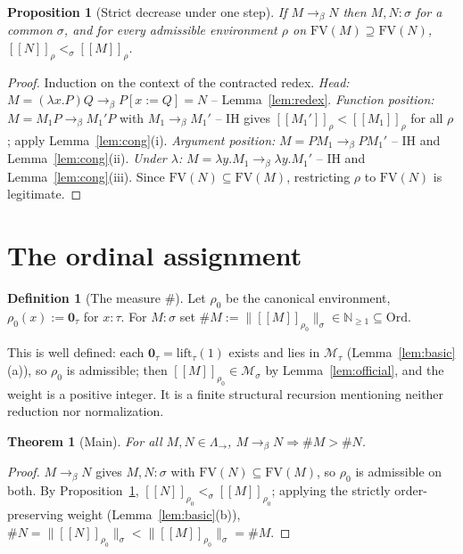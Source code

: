 \documentclass{amsart}
\newtheorem{theorem}{Theorem}
\newtheorem{proposition}{Proposition}
\theoremstyle{definition}
\newtheorem{definition}{Definition}
\newcommand{\Ord}{\mathrm{Ord}}
\newcommand{\interp}[1]{[\![#1]\!]}
\newcommand{\To}{\to_\beta}
\newcommand{\FV}{\mathrm{FV}}
\begin{document}
\begin{proposition}[Strict decrease under one step]\label{prop:step}
If $M\To N$ then $M,N:\sigma$ for a common $\sigma$, and for every admissible environment
$\rho$ on $\FV(M)\supseteq\FV(N)$, $\interp{N}_\rho<_\sigma\interp{M}_\rho$.
\end{proposition}

\begin{proof}
Induction on the context of the contracted redex.
\emph{Head:} $M=(\lambda x.P)Q\To P[x:=Q]=N$ -- Lemma~\ref{lem:redex}.
\emph{Function position:} $M=M_1P\To M_1'P$ with $M_1\To M_1'$ -- IH gives
$\interp{M_1'}_\rho<\interp{M_1}_\rho$ for all $\rho$; apply Lemma~\ref{lem:cong}(i).
\emph{Argument position:} $M=PM_1\To PM_1'$ -- IH and Lemma~\ref{lem:cong}(ii).
\emph{Under $\lambda$:} $M=\lambda y.M_1\To\lambda y.M_1'$ -- IH and
Lemma~\ref{lem:cong}(iii). Since $\FV(N)\subseteq\FV(M)$, restricting $\rho$ to $\FV(N)$ is
legitimate.
\end{proof}

\section{The ordinal assignment}

\begin{definition}[The measure $\#$]\label{def:hash}
Let $\rho_0$ be the canonical environment, $\rho_0(x):=\mathbf 0_\tau$ for $x:\tau$. For
$M:\sigma$ set $\#M:=\|\interp{M}_{\rho_0}\|_\sigma\in\mathbb N_{\ge1}\subseteq\Ord$.
\end{definition}

This is well defined: each $\mathbf 0_\tau=\mathrm{lift}_\tau(1)$ exists and lies in
$\mathcal M_\tau$ (Lemma~\ref{lem:basic}(a)), so $\rho_0$ is admissible; then
$\interp{M}_{\rho_0}\in\mathcal M_\sigma$ by Lemma~\ref{lem:official}, and the weight is a
positive integer. It is a finite structural recursion mentioning neither reduction nor
normalization.

\begin{theorem}[Main]\label{thm:main}
For all $M,N\in\Lambda_\to$, $M\To N\Rightarrow\#M>\#N$.
\end{theorem}

\begin{proof}
$M\To N$ gives $M,N:\sigma$ with $\FV(N)\subseteq\FV(M)$, so $\rho_0$ is admissible on both.
By Proposition~\ref{prop:step}, $\interp{N}_{\rho_0}<_\sigma\interp{M}_{\rho_0}$; applying
the strictly order-preserving weight (Lemma~\ref{lem:basic}(b)),
$\#N=\|\interp{N}_{\rho_0}\|_\sigma<\|\interp{M}_{\rho_0}\|_\sigma=\#M$.
\end{proof}
\end{document}
